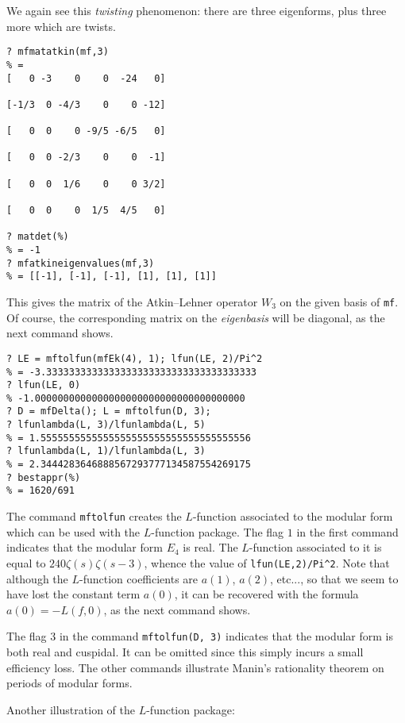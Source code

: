 \documentclass[11pt]{article}
\newcommand{\z}{\zeta}
\def\kbd#1{{\tt #1}}
\begin{document}
We again see this \emph{twisting} phenomenon: there are three eigenforms,
plus three more which are twists.

\begin{verbatim}
? mfmatatkin(mf,3)
% =
[   0 -3    0    0  -24   0]

[-1/3  0 -4/3    0    0 -12]

[   0  0    0 -9/5 -6/5   0]

[   0  0 -2/3    0    0  -1]

[   0  0  1/6    0    0 3/2]

[   0  0    0  1/5  4/5   0]

? matdet(%)
% = -1
? mfatkineigenvalues(mf,3)
% = [[-1], [-1], [-1], [1], [1], [1]]
\end{verbatim}

This gives the matrix of the Atkin--Lehner operator $W_3$ on the given
basis of \kbd{mf}. Of course, the corresponding matrix on the \emph{eigenbasis}
will be diagonal, as the next command shows.

\medskip

\begin{verbatim}
? LE = mftolfun(mfEk(4), 1); lfun(LE, 2)/Pi^2
% = -3.3333333333333333333333333333333333333
? lfun(LE, 0)
% -1.0000000000000000000000000000000000000
? D = mfDelta(); L = mftolfun(D, 3);
? lfunlambda(L, 3)/lfunlambda(L, 5)
% = 1.5555555555555555555555555555555555556
? lfunlambda(L, 1)/lfunlambda(L, 3)
% = 2.3444283646888567293777134587554269175
? bestappr(%)
% = 1620/691
\end{verbatim}

The command \kbd{mftolfun} creates the $L$-function associated to the
modular form which can be used with the $L$-function package.
The flag $1$ in the first command indicates that the modular form $E_4$ is
real. The $L$-function associated to it is equal to $240\z(s)\z(s-3)$,
whence the value of {\tt lfun(LE,2)/Pi\^{}2}. Note that although the
$L$-function coefficients are $a(1)$, $a(2)$, etc..., so that we seem to have
lost the constant term $a(0)$, it can be recovered with the formula
$a(0)=-L(f,0)$, as the next command shows.

The flag $3$ in the command \kbd{mftolfun(D, 3)} indicates that the
modular form is both real and cuspidal. It can be omitted since this simply
incurs a small efficiency loss. The other commands illustrate Manin's
rationality theorem on periods of modular forms.

Another illustration of the $L$-function package:
\end{document}

